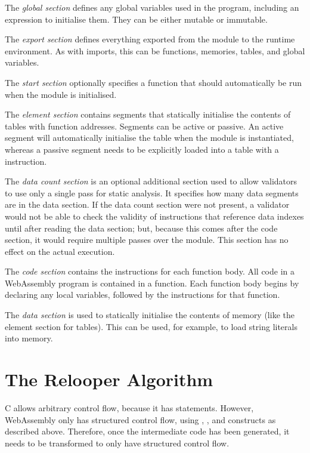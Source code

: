 \documentclass[00-main.tex]{subfiles}
\begin{document}
The \emph{global section} defines any global variables used in the program, including an expression to initialise them. They can be either mutable or immutable.

The \emph{export section} defines everything exported from the module to the runtime environment.
As with imports, this can be functions, memories, tables, and global variables.

The \emph{start section} optionally specifies a function that should automatically be run when the module is initialised.

The \emph{element section} contains segments that statically initialise the contents of tables with function addresses.
Segments can be active or passive.
An active segment will automatically initialise the table when the module is instantiated, whereas a passive segment needs to be explicitly loaded into a table with a  instruction.

The \emph{data count section} is an optional additional section used to allow validators to use only a single pass for static analysis.
It specifies how many data segments are in the data section.
If the data count section were not present, a validator would not be able to check the validity of instructions that reference data indexes until after reading the data section; but, because this comes after the code section, it would require multiple passes over the module.
This section has no effect on the actual execution.

The \emph{code section} contains the instructions for each function body.
All code in a WebAssembly program is contained in a function.
Each function body begins by declaring any local variables, followed by the instructions for that function.

The \emph{data section} is used to statically initialise the contents of memory (like the element section for tables).
This can be used, for example, to load string literals into memory.


\section{The Relooper Algorithm}\label{sec:prep:relooper}

C allows arbitrary control flow, because it has  statements.
However, WebAssembly only has structured control flow, using , , and  constructs as described above.
Therefore, once the intermediate code has been generated, it needs to be transformed to only have structured control flow.
\end{document}
